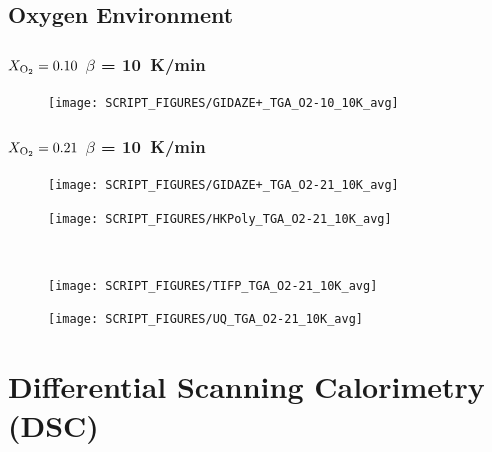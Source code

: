 \documentclass{book}
\begin{document}
\begin{landscape}
\section{Oxygen Environment}
\label{TGA_O2}
\subsection{$X_{\rm O_2}=0.10$ $\beta$ = 10~K/min}
\begin{minipage}{0.65\textwidth}
\begin{figure}[H]
{\texttt{[image: SCRIPT\_FIGURES/GIDAZE+\_TGA\_O2-10\_10K\_avg]}}\\
\end{figure}
\end{minipage} 
\vfill

\subsection{$X_{\rm O_2}=0.21$ $\beta$ = 10~K/min}
\begin{minipage}{0.65\textwidth}
\begin{figure}[H]
{\texttt{[image: SCRIPT\_FIGURES/GIDAZE+\_TGA\_O2-21\_10K\_avg]}}\\
\end{figure}
\end{minipage} 
\begin{minipage}{0.35\textwidth}
\begin{figure}[H]
{\texttt{[image: SCRIPT\_FIGURES/HKPoly\_TGA\_O2-21\_10K\_avg]}}\\
\end{figure}
\end{minipage}\\
\begin{minipage}{0.65\textwidth}
\begin{figure}[H]
{\texttt{[image: SCRIPT\_FIGURES/TIFP\_TGA\_O2-21\_10K\_avg]}}\\
\end{figure}
\end{minipage} 
\begin{minipage}{0.35\textwidth}
\begin{figure}[H]
{\texttt{[image: SCRIPT\_FIGURES/UQ\_TGA\_O2-21\_10K\_avg]}}\\
\end{figure}
\end{minipage}


\chapter{Differential Scanning Calorimetry (DSC)}

\end{landscape}
\end{document}
